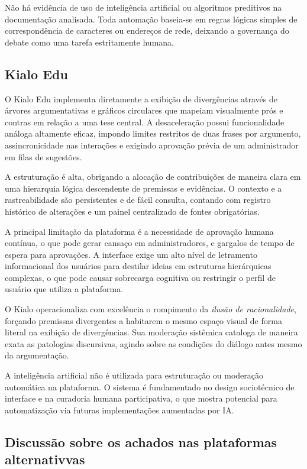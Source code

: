 \documentclass[conference]{IEEEtran} \IEEEoverridecommandlockouts %
\begin{document}
Não há evidência de uso de inteligência artificial ou algoritmos preditivos na documentação analisada. Toda automação baseia-se em regras lógicas simples de correspondência de caracteres ou endereços de rede, deixando a governança do debate como uma tarefa estritamente humana.

\subsection{Kialo Edu}

O Kialo Edu implementa diretamente a exibição de divergências através de árvores argumentativas e gráficos circulares que mapeiam visualmente prós e contras em relação a uma tese central. A desaceleração possui funcionalidade análoga altamente eficaz, impondo limites restritos de duas frases por argumento, assincronicidade nas interações e exigindo aprovação prévia de um administrador em filas de sugestões. 

A estruturação é alta, obrigando a alocação de contribuições de maneira clara em uma hierarquia lógica descendente de premissas e evidências. O contexto e a rastreabilidade são persistentes e de fácil consulta, contando com registro histórico de alterações e um painel centralizado de fontes obrigatórias.

A principal limitação da plataforma é a necessidade de aprovação humana contínua, o que pode gerar cansaço em administradores, e gargalos de tempo de espera para aprovações. A interface exige um alto nível de letramento informacional dos usuários para destilar ideias em estruturas hierárquicas complexas, o que pode causar sobrecarga cognitiva ou restringir o perfil de usuário que utiliza a plataforma.

O Kialo operacionaliza com excelência o rompimento da \textit{ilusão de racionalidade}, forçando premissas divergentes a habitarem o mesmo espaço visual de forma literal na exibição de divergências. Sua moderação sistêmica cataloga de maneira exata as patologias discursivas, agindo sobre as condições do diálogo antes mesmo da argumentação. 

A inteligência artificial não é utilizada para estruturação ou moderação automática na plataforma. O sistema é fundamentado no design sociotécnico de interface e na curadoria humana participativa, o que mostra potencial para automatização via futuras implementações aumentadas por IA.

\subsection{Discussão sobre os achados nas plataformas alternativvas}
\end{document}
